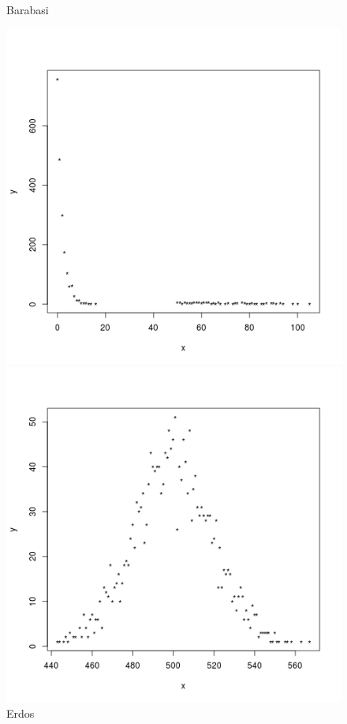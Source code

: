 \documentclass[palatino]{apuntes}
\begin{document}
\begin{figure}[h!] 
\centering 
\begin{minipage}[b]{0.4\textwidth}
	\caption{Barabasi}
	\includegraphics[scale=0.45]{img/barabasi_grado}
\end{minipage}
\hfill
\begin{minipage}[b]{0.4\textwidth}
	\caption{Erdos}
	\includegraphics[scale=0.45]{img/erdos_grado}
\end{minipage}
\end{figure} 
\end{document}
